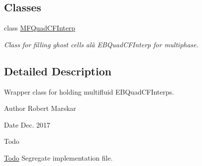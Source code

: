 \subsection*{Classes}
\begin{DoxyCompactItemize}
\item 
class \hyperlink{classMFQuadCFInterp}{M\+F\+Quad\+C\+F\+Interp}
\begin{DoxyCompactList}\small\item\em Class for filling ghost cells alà E\+B\+Quad\+C\+F\+Interp for multiphase. \end{DoxyCompactList}\end{DoxyCompactItemize}


\subsection{Detailed Description}
Wrapper class for holding multifluid E\+B\+Quad\+C\+F\+Interps. 

\begin{DoxyAuthor}{Author}
Robert Marskar 
\end{DoxyAuthor}
\begin{DoxyDate}{Date}
Dec. 2017 
\end{DoxyDate}
\begin{DoxyRefDesc}{Todo}
\item[\hyperlink{todo__todo000006}{Todo}]Segregate implementation file. \end{DoxyRefDesc}
